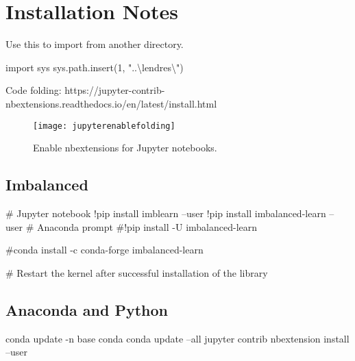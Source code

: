 	\chapter{Installation Notes}

Use this to import from another directory.
	\begin{code}[\codenumbering]{}
		\codeitemnonumber import sys
		\codeitemnonumber sys.path.insert(1, "..\textbackslash{}lendres\textbackslash{}")
	\end{code}


Code folding:
https://jupyter-contrib-nbextensions.readthedocs.io/en/latest/install.html

	\begin{figure}[tbp]
		\centering
		\texttt{[image: jupyterenablefolding]}
		\caption[Enable nbextensions for Jupyter notebooks]{Enable nbextensions for Jupyter notebooks.}
		\label{fig:normaldistrution}
	\end{figure}


	\section{Imbalanced}
	\begin{code}[\codenumbering]{}
		\codeitemnonumber \# Jupyter notebook
		\codeitemnonumber !pip install imblearn --user
		\codeitemnonumber !pip install imbalanced-learn --user
		\codeitemnonumber
		\codeitemnonumber \# Anaconda prompt
		\codeitemnonumber \#!pip install -U imbalanced-learn

		\codeitemnonumber \#conda install -c conda-forge imbalanced-learn

		\codeitemnonumber \# Restart the kernel after successful installation of the library
	\end{code}

	\section{Anaconda and Python}
	\begin{code}[\codenumbering]{}
		\codeitemnonumber conda update -n base conda
		\codeitemnonumber conda update --all
		\codeitemnonumber jupyter contrib nbextension install --user
	\end{code}


